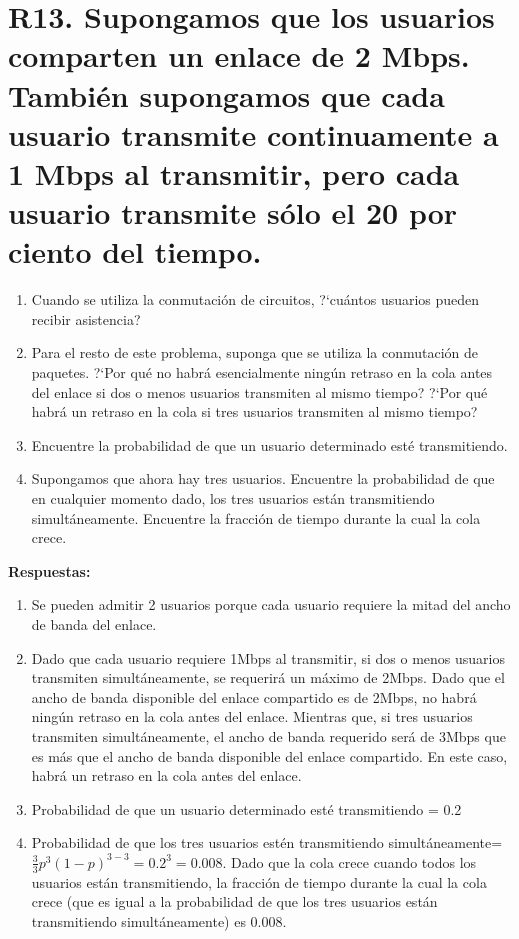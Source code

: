 \documentclass[a4paper, 11pt]{article}
\theoremstyle{definition} \theoremstyle{remark}
\begin{document}
     \section{R13. Supongamos que los usuarios comparten un enlace de 2 Mbps. Tambi\'en supongamos que cada usuario transmite continuamente a 1 Mbps al transmitir, pero cada usuario transmite s\'olo el 20 por ciento del tiempo.}
     \renewcommand{\theenumi}{\alph{enumi}}
     \begin{enumerate}
       \item Cuando se utiliza la conmutaci\'on de circuitos, ?`cu\'antos usuarios pueden recibir asistencia?
       \item Para el resto de este problema, suponga que se utiliza la conmutaci\'on de paquetes. ?`Por qu\'e no habr\'a esencialmente ning\'un retraso en la cola antes del enlace si dos o menos usuarios transmiten al mismo tiempo? ?`Por qu\'e habr\'a un retraso en la cola si tres usuarios transmiten al mismo tiempo?
       \item Encuentre la probabilidad de que un usuario determinado est\'e transmitiendo.
       \item Supongamos que ahora hay tres usuarios. Encuentre la probabilidad de que en cualquier momento dado, los tres usuarios est\'an transmitiendo simult\'aneamente. Encuentre la fracci\'on de tiempo durante la cual la cola crece.
     \end{enumerate}
     \textbf{Respuestas:}
     \renewcommand{\theenumi}{\alph{enumi}}
     \begin{enumerate}
       \item Se pueden admitir 2 usuarios porque cada usuario requiere la mitad del ancho de banda del enlace.
       \item Dado que cada usuario requiere 1Mbps al transmitir, si dos o menos usuarios transmiten simult\'aneamente, se requerir\'a un m\'aximo de 2Mbps. Dado que el ancho de banda disponible del enlace compartido es de 2Mbps, no habr\'a ningún retraso en la cola antes del enlace. Mientras que, si tres usuarios transmiten simult\'aneamente, el ancho de banda requerido ser\'a de 3Mbps que es m\'as que el ancho de banda disponible del enlace compartido. En este caso, habr\'a un retraso en la cola antes del enlace.
       \item Probabilidad de que un usuario determinado est\'e transmitiendo = 0.2
       \item Probabilidad de que los tres usuarios est\'en transmitiendo simult\'aneamente= $\frac{3}{3}p^3(1-p)^{3-3} = 0.2^3=0.008$. Dado que la cola crece cuando todos los usuarios est\'an transmitiendo, la fracci\'on de tiempo durante la cual la cola crece (que es igual a la probabilidad de que los tres usuarios est\'an transmitiendo simult\'aneamente) es 0.008.
     \end{enumerate}
\end{document}

